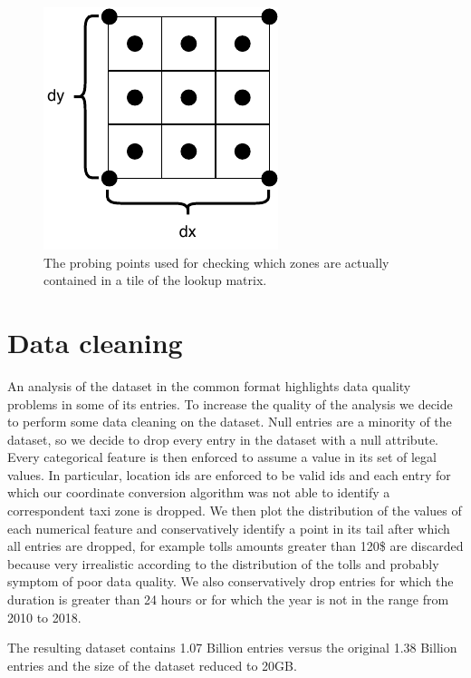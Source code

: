 \documentclass{acm_proc_article-sp-sigmod09}
\begin{document}
\begin{figure}
	\centering
	\includegraphics{resources/probing_points.pdf}
	\caption{The probing points used for checking which zones are actually contained in a tile of the lookup matrix.}
	\label{fig:probing_points}
\end{figure}


\section{Data cleaning}

An analysis of the dataset in the common format highlights data quality problems in some of its entries. To increase the quality of the analysis we decide to perform some data cleaning on the dataset.
Null entries are a minority of the dataset, so we decide to drop every entry in the dataset with a null attribute. Every categorical feature is then enforced to assume a value in its set of legal values. In particular, location ids are enforced to be valid ids and each entry for which our coordinate conversion algorithm was not able to identify a correspondent taxi zone is dropped. We then plot the distribution of the values of each numerical feature and conservatively identify a point in its tail after which all entries are dropped, for example tolls amounts greater than 120\$ are discarded because very irrealistic according to the distribution of the tolls and probably symptom of poor data quality. We also conservatively drop entries for which the duration is greater than 24 hours or for which the year is not in the range from 2010 to 2018.

The resulting dataset contains 1.07 Billion entries versus the original 1.38 Billion entries and the size of the dataset reduced to 20GB.

\end{document}
